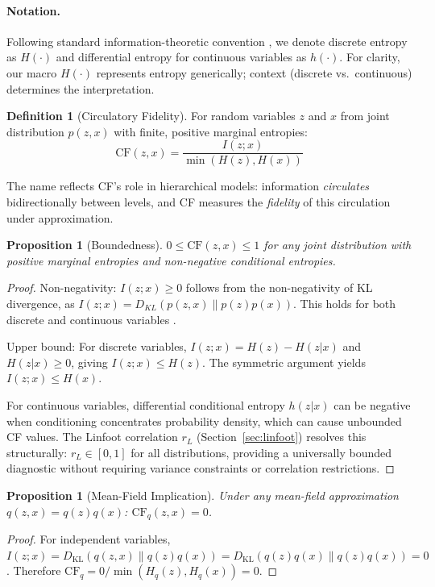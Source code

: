\documentclass[10pt]{article} %
\theoremstyle{plain}
\newtheorem{proposition}[theorem]{Proposition}
\theoremstyle{definition}
\newtheorem{definition}[theorem]{Definition}
\newcommand{\CF}{\mathrm{CF}}
\newcommand{\MI}{I}
\newcommand{\Ent}{H}
\newcommand{\KL}{D_{\mathrm{KL}}}
\begin{document}
\paragraph{Notation.} Following standard information-theoretic convention \citep{cover2006elements}, we denote discrete entropy as $H(\cdot)$ and differential entropy for continuous variables as $h(\cdot)$. For clarity, our macro $\Ent(\cdot)$ represents entropy generically; context (discrete vs.\ continuous) determines the interpretation.

\begin{definition}[Circulatory Fidelity]
For random variables $z$ and $x$ from joint distribution $p(z,x)$ with finite, positive marginal entropies:
\begin{equation}
\CF(z, x) = \frac{\MI(z; x)}{\min(\Ent(z), \Ent(x))}
\end{equation}
\end{definition}

The name reflects CF's role in hierarchical models: information \emph{circulates} bidirectionally between levels, and CF measures the \emph{fidelity} of this circulation under approximation.

\begin{proposition}[Boundedness]
\label{prop:bounded}
$0 \leq \CF(z, x) \leq 1$ for any joint distribution with positive marginal entropies and non-negative conditional entropies.
\end{proposition}
\begin{proof}
Non-negativity: $\MI(z;x) \geq 0$ follows from the non-negativity of KL divergence, as $\MI(z;x) = D_{KL}(p(z,x) \| p(z)p(x))$. This holds for both discrete and continuous variables \citep{cover2006elements}.

Upper bound: For discrete variables, $\MI(z;x) = \Ent(z) - \Ent(z|x)$ and $\Ent(z|x) \geq 0$, giving $\MI(z;x) \leq \Ent(z)$. The symmetric argument yields $\MI(z;x) \leq \Ent(x)$.

For continuous variables, differential conditional entropy $h(z|x)$ can be negative when conditioning concentrates probability density, which can cause unbounded CF values. The Linfoot correlation $r_L$ (Section~\ref{sec:linfoot}) resolves this structurally: $r_L \in [0,1]$ for all distributions, providing a universally bounded diagnostic without requiring variance constraints or correlation restrictions.
\end{proof}

\begin{proposition}[Mean-Field Implication]
\label{prop:mf-implication}
Under any mean-field approximation $q(z,x) = q(z)q(x)$: $\CF_q(z,x) = 0$.
\end{proposition}
\begin{proof}
For independent variables, $\MI(z;x) = \KL(q(z,x) \| q(z)q(x)) = \KL(q(z)q(x) \| q(z)q(x)) = 0$. Therefore $\CF_q = 0 / \min(\Ent_q(z), \Ent_q(x)) = 0$.
\end{proof}
\end{document}
